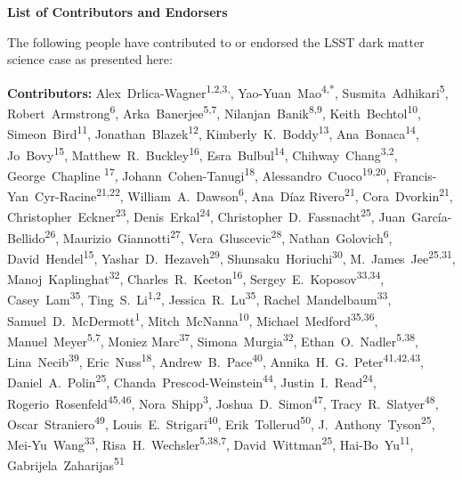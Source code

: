 
\begin{center}
  {\Large \bf List of Contributors and Endorsers}
\end{center}
\bigskip

The following people have contributed to or endorsed the LSST dark matter science case as presented here:

\def\altaffilmark#1{\textsuperscript{#1}}
\def\affil#1{\noindent #1 \\}

\normalsize
\begin{raggedright}
\textbf{Contributors:}
Alex~Drlica-Wagner\altaffilmark{1,2,3,\textdagger},
Yao-Yuan~Mao\altaffilmark{4,*},
Susmita~Adhikari\altaffilmark{5},
Robert~Armstrong\altaffilmark{6},
Arka~Banerjee\altaffilmark{5,7},
Nilanjan~Banik\altaffilmark{8,9},
Keith~Bechtol\altaffilmark{10},
Simeon~Bird\altaffilmark{11},
Jonathan~Blazek\altaffilmark{12},
Kimberly~K.~Boddy\altaffilmark{13},
Ana~Bonaca\altaffilmark{14},
Jo~Bovy\altaffilmark{15},
Matthew~R.~Buckley\altaffilmark{16},
Esra~Bulbul\altaffilmark{14},
Chihway~Chang\altaffilmark{3,2},
George~Chapline \altaffilmark{17},
Johann~Cohen-Tanugi\altaffilmark{18},
Alessandro~Cuoco\altaffilmark{19,20},
Francis-Yan~Cyr-Racine\altaffilmark{21,22},
William~A.~Dawson\altaffilmark{6},
Ana~D\'{i}az Rivero\altaffilmark{21},
Cora~Dvorkin\altaffilmark{21},
Christopher~Eckner\altaffilmark{23},
Denis~Erkal\altaffilmark{24},
Christopher~D.~Fassnacht\altaffilmark{25},
Juan~Garc\'ia-Bellido\altaffilmark{26},
Maurizio~Giannotti\altaffilmark{27},
Vera~Gluscevic\altaffilmark{28},
Nathan~Golovich\altaffilmark{6},
David~Hendel\altaffilmark{15},
Yashar~D.~Hezaveh\altaffilmark{29},
Shunsaku~Horiuchi\altaffilmark{30},
M.~James~Jee\altaffilmark{25,31},
Manoj~Kaplinghat\altaffilmark{32},
Charles~R.~Keeton\altaffilmark{16},
Sergey~E.~Koposov\altaffilmark{33,34},
Casey~Lam\altaffilmark{35},
Ting~S.~Li\altaffilmark{1,2},
Jessica~R.~Lu\altaffilmark{35},
Rachel~Mandelbaum\altaffilmark{33},
Samuel~D.~McDermott\altaffilmark{1},
Mitch~McNanna\altaffilmark{10},
Michael~Medford\altaffilmark{35,36},
Manuel~Meyer\altaffilmark{5,7},
Moniez Marc\altaffilmark{37},
Simona~Murgia\altaffilmark{32},
Ethan~O.~Nadler\altaffilmark{5,38},
Lina~Necib\altaffilmark{39},
Eric~Nuss\altaffilmark{18},
Andrew~B.~Pace\altaffilmark{40},
Annika~H.~G.~Peter\altaffilmark{41,42,43},
Daniel~A.~Polin\altaffilmark{25},
Chanda~Prescod-Weinstein\altaffilmark{44},
Justin~I.~Read\altaffilmark{24},
Rogerio~Rosenfeld\altaffilmark{45,46},
Nora~Shipp\altaffilmark{3},
Joshua~D.~Simon\altaffilmark{47},
Tracy~R.~Slatyer\altaffilmark{48},
Oscar~Straniero\altaffilmark{49},
Louis~E.~Strigari\altaffilmark{40},
Erik~Tollerud\altaffilmark{50},
J.~Anthony~Tyson\altaffilmark{25},
Mei-Yu~Wang\altaffilmark{33},
Risa~H.~Wechsler\altaffilmark{5,38,7},
David~Wittman\altaffilmark{25},
Hai-Bo~Yu\altaffilmark{11},
Gabrijela~Zaharijas\altaffilmark{51}


\end{raggedright}
